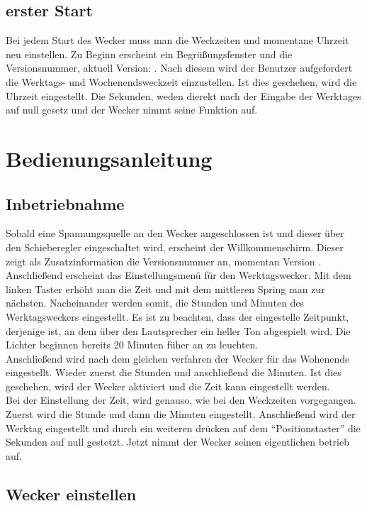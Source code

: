 \documentclass[12pt,a4paper,titlepage,headinclude]{scrartcl}
\numberwithin{equation}{subsection}
\begin{document}
\subsection{erster Start}
Bei jedem Start des Wecker muss man die Weckzeiten und momentane Uhrzeit neu einstellen.
Zu Beginn erscheint ein Begrüßungsfenster und die Versionsnummer, aktuell Version: \titel.
Nach diesem wird der Benutzer aufgefordert die Werktags- und Wochenendsweckzeit einzustellen.
Ist dies geschehen, wird die Uhrzeit eingestellt.
Die Sekunden, weden dierekt nach der Eingabe der Werktages auf null gesetz und der Wecker nimmt seine Funktion auf.


\newpage
\section{Bedienungsanleitung}
\label{sec:Bedienungsanleitung}

\subsection{Inbetriebnahme}
Sobald eine Spannungsquelle an den Wecker angeschlossen ist und dieser über den Schieberegler eingeschaltet wird, erscheint der Willkommenschirm.
Dieser zeigt als Zusatzinformation die Versionsnummer an, momentan Version \titel.
Anschließend erscheint das Einstellungsmenü für den Werktagswecker.
Mit dem linken Taster erhöht man die Zeit und mit dem mittleren Spring man zur nächsten.
Nacheinander werden somit, die Stunden und Minuten des Werktagsweckers eingestellt.
Es ist zu beachten, dass der eingestelle Zeitpunkt, derjenige ist, an dem über den Lautsprecher ein heller Ton abgespielt wird.
Die Lichter beginnen bereits 20 Minuten füher an zu leuchten.\\
Anschließend wird nach dem gleichen verfahren der Wecker für das Wohenende eingestellt.
Wieder zuerst die Stunden und anschließend die Minuten.
Ist dies geschehen, wird der Wecker aktiviert und die Zeit kann eingestellt werden.\\
Bei der Einstellung der Zeit, wird genauso, wie bei den Weckzeiten vorgegangen.
Zuerst wird die Stunde und dann die Minuten eingestellt.
Anschließend wird der Werktag eingestellt und durch ein weiteren drücken auf dem "`Positionstaster"' die Sekunden auf null gestetzt.
Jetzt nimmt der Wecker seinen eigentlichen betrieb auf.



\subsection{Wecker einstellen}
\end{document}
